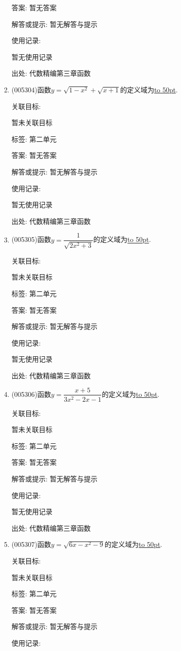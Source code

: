 \documentclass[10pt,a4paper]{article}
\newcommand{\blank}[1]{\underline{\hbox to #1pt{}}}
\begin{document}
\begin{enumerate}[1.]
答案: 暂无答案

解答或提示: 暂无解答与提示

使用记录:

暂无使用记录


出处: 代数精编第三章函数
\item { (005304)}函数$y=\sqrt {1-x^2}+\sqrt {x+1}$的定义域为\blank{50}.


关联目标:

暂未关联目标



标签: 第二单元

答案: 暂无答案

解答或提示: 暂无解答与提示

使用记录:

暂无使用记录


出处: 代数精编第三章函数
\item { (005305)}函数$y=\dfrac 1{\sqrt {2x^2+3}}$的定义域为\blank{50}.


关联目标:

暂未关联目标



标签: 第二单元

答案: 暂无答案

解答或提示: 暂无解答与提示

使用记录:

暂无使用记录


出处: 代数精编第三章函数
\item { (005306)}函数$y=\dfrac{x+5}{3x^2-2x-1}$的定义域为\blank{50}.


关联目标:

暂未关联目标



标签: 第二单元

答案: 暂无答案

解答或提示: 暂无解答与提示

使用记录:

暂无使用记录


出处: 代数精编第三章函数
\item { (005307)}函数$y=\sqrt {6x-x^2-9}$的定义域为\blank{50}.


关联目标:

暂未关联目标



标签: 第二单元

答案: 暂无答案

解答或提示: 暂无解答与提示

使用记录:


\end{enumerate}
\end{document}
